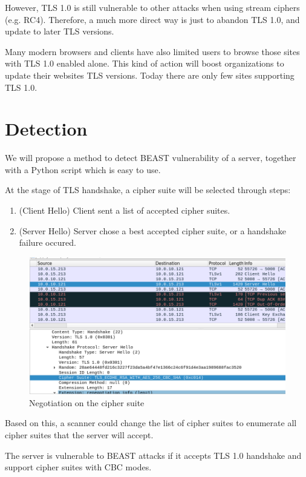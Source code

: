 \documentclass{acm_proc_article-sp}
\begin{document}
However, TLS 1.0 is still vulnerable to other attacks when using stream ciphers (e.g. RC4).
Therefore, a much more direct way is just to abandon TLS 1.0, and update to later TLS
versions.

Many modern browsers and clients have also limited users to browse those sites
with TLS 1.0 enabled alone. This kind of action will boost organizations to update their
websites TLS versions. Today there are only few sites supporting TLS 1.0.

\section{Detection}

We will propose a method to detect BEAST vulnerability of a server, together with a
Python script which is easy to use.

At the stage of TLS handshake, a cipher suite will be selected through steps:

\begin{enumerate}
    \item (Client Hello) Client sent a list of accepted cipher suites.
    \item (Server Hello) Server chose a best accepted cipher suite, or a handshake failure occured.
\end{enumerate}

\begin{figure}[htb]
    \centering
    \includegraphics[keepaspectratio, width=\linewidth]{./figures/tls-handshake-cipher-spec.png}
    \caption{Negotiation on the cipher suite}
\end{figure}

Based on this, a scanner could change the list of cipher suites to enumerate all
cipher suites that the server will accept.

The server is vulnerable to BEAST attacks if it accepts TLS 1.0 handshake and support
cipher suites with CBC modes.
\end{document}
